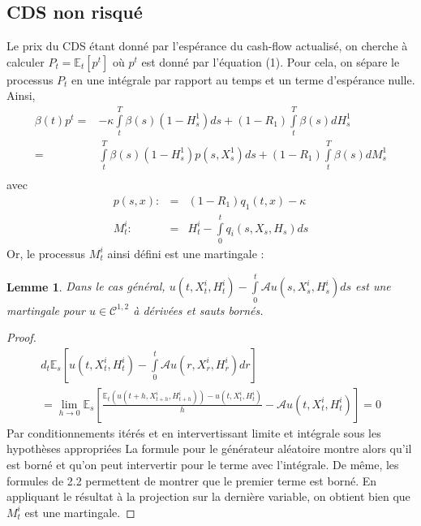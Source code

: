\documentclass[a4paper]{article}
\newtheorem{lemma}[theorem]{Lemme}
\theoremstyle{definition}
\theoremstyle{remark}
\begin{document}
\subsection{CDS non risqué}
Le prix du CDS étant donné par l'espérance du cash-flow actualisé, on cherche à calculer $P_{t} = \mathbb{E}_{t} \left[ p^{t} \right]$ où $p^{t}$ est donné par l'équation (1). Pour cela, on sépare le processus $P_{t}$ en une intégrale par rapport au temps et un terme d'espérance nulle.
Ainsi, \\
\begin{eqnarray*}
\beta(t) p^t =& -\kappa \int \limits_{t}^{T}\beta(s)(1-H^{1}_{s})ds + (1-R_{1})\int \limits_{t}^{T} \beta(s) dH_{s}^{1} \\
=&\int \limits_{t}^{T}\beta(s)(1-H^{1}_{s})p(s, X^{1}_s)ds + (1-R_{1})\int \limits_{t}^{T} \beta(s) dM_{s}^{1} \\
\end{eqnarray*}
avec
\begin{eqnarray}
p(s, x) :&=& (1-R_1)q_1(t,x) - \kappa \\
M_t^i :&=& H_t^i - \int \limits_0^t q_i (s, X_s, H_s) ds
\end{eqnarray}
Or, le processus $M_t^i$ ainsi défini est une martingale : \\
\begin{lemma}
Dans le cas général, $u(t, X^i_t, H^i_t) - \int \limits_0^t \mathcal{A}u(s, X^i_s, H^i_s)ds$ est une martingale pour $u \in \mathcal{C}^{1, 2}$ à dérivées et sauts bornés.
\end{lemma}
\begin{proof}
\begin{multline*}
d_t\mathbb{E}_s \left[ u(t, X^i_t, H^i_t) - \int \limits_0^t \mathcal{A}u(r, X^i_r, H^i_r)dr \right] \\
= \lim \limits_{h \rightarrow 0} \mathbb{E}_s \left[ \frac{\mathbb{E}_t (u(t+h, X^i_{t+h}, H^i_{t+h})) - u(t, X^i_t, H^i_t)}{h} - \mathcal{A}u(t,X^i_t,H^i_t)\right]
= 0
\end{multline*}
Par conditionnements itérés et en intervertissant limite et intégrale sous les hypothèses appropriées La formule pour le générateur aléatoire montre alors qu'il est borné et qu'on peut intervertir pour le terme avec l'intégrale. De même, les formules de 2.2 permettent de montrer que le premier terme est borné. En appliquant le résultat à la projection sur la dernière variable, on obtient bien que $M^i_t$ est une martingale.
\end{proof}
\end{document}
